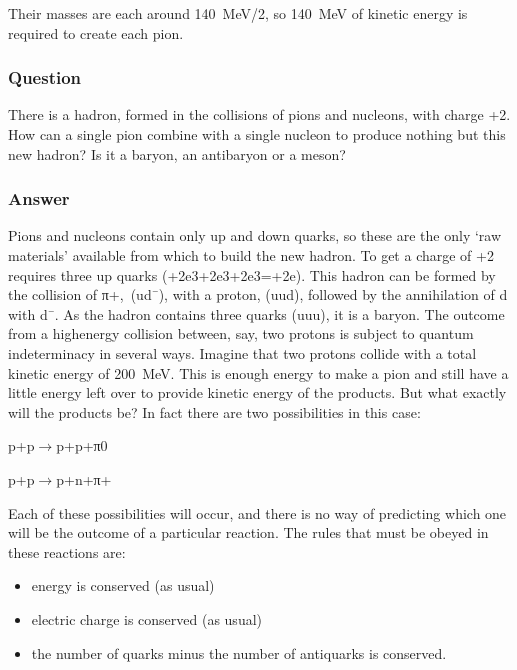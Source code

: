 \documentclass[letterpaper,10pt,english]{sphinxmanual}
\begin{document}
Their masses are each around 140 MeV/2, so 140 MeV of kinetic energy is required to create each pion.


\subsubsection{Question}
\label{\detokenize{content/session_00/Part_00_05:Question}}
There is a hadron, formed in the collisions of pions and nucleons, with charge +2. How can a single pion combine with a single nucleon to produce nothing but this new hadron? Is it a baryon, an antibaryon or a meson?


\subsubsection{Answer}
\label{\detokenize{content/session_00/Part_00_05:Answer}}
Pions and nucleons contain only up and down quarks, so these are the only ‘raw materials’ available from which to build the new hadron. To get a charge of +2 requires three up quarks (+2e3+2e3+2e3=+2e). This hadron can be formed by the collision of π+, (ud¯), with a proton, (uud), followed by the annihilation of d with d¯. As the hadron contains three quarks (uuu), it is a baryon. The outcome from a high\sphinxhyphen{}energy collision between, say, two protons is subject to quantum indeterminacy in
several ways. Imagine that two protons collide with a total kinetic energy of 200 MeV. This is enough energy to make a pion and still have a little energy left over to provide kinetic energy of the products. But what exactly will the products be? In fact there are two possibilities in this case:













p+p\(\rightarrow\)p+p+π0





p+p\(\rightarrow\)p+n+π+









Each of these possibilities will occur, and there is no way of predicting which one will be the outcome of a particular reaction. The rules that must be obeyed in these reactions are:
\begin{itemize}
\item {} 
energy is conserved (as usual)

\item {} 
electric charge is conserved (as usual)

\item {} 
the number of quarks minus the number of antiquarks is conserved.

\end{itemize}
\end{document}

